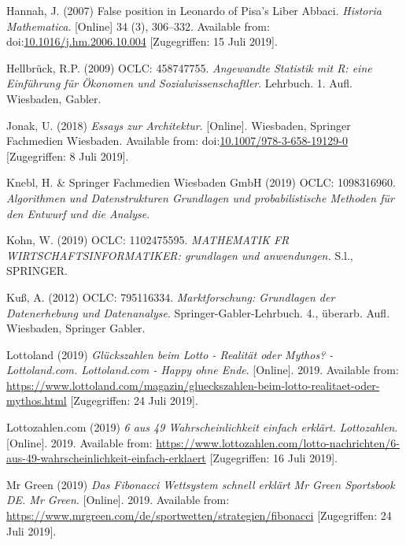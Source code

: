 \documentclass[ngerman,]{article}
\begin{document}
\hypertarget{ref-hannah_false_2007}{}
Hannah, J. (2007) False position in Leonardo of Pisa's Liber Abbaci.
\emph{Historia Mathematica}. {[}Online{]} 34 (3), 306--332. Available
from:
doi:\href{https://doi.org/10.1016/j.hm.2006.10.004}{10.1016/j.hm.2006.10.004}
{[}Zugegriffen: 15 Juli 2019{]}.

\hypertarget{ref-hellbruck_angewandte_2009}{}
Hellbrück, R.P. (2009) OCLC: 458747755. \emph{Angewandte Statistik mit
R: eine Einführung für Ökonomen und Sozialwissenschaftler}. Lehrbuch. 1.
Aufl. Wiesbaden, Gabler.

\hypertarget{ref-jonak_essays_2018}{}
Jonak, U. (2018) \emph{Essays zur Architektur}. {[}Online{]}. Wiesbaden,
Springer Fachmedien Wiesbaden. Available from:
doi:\href{https://doi.org/10.1007/978-3-658-19129-0}{10.1007/978-3-658-19129-0}
{[}Zugegriffen: 8 Juli 2019{]}.

\hypertarget{ref-knebl_algorithmen_2019}{}
Knebl, H. \& Springer Fachmedien Wiesbaden GmbH (2019) OCLC: 1098316960.
\emph{Algorithmen und Datenstrukturen Grundlagen und probabilistische
Methoden für den Entwurf und die Analyse}.

\hypertarget{ref-kohn_mathematik_2019}{}
Kohn, W. (2019) OCLC: 1102475595. \emph{MATHEMATIK FR
WIRTSCHAFTSINFORMATIKER: grundlagen und anwendungen.} S.l., SPRINGER.

\hypertarget{ref-kus_marktforschung:_2012}{}
Kuß, A. (2012) OCLC: 795116334. \emph{Marktforschung: Grundlagen der
Datenerhebung und Datenanalyse}. Springer-Gabler-Lehrbuch. 4., überarb.
Aufl. Wiesbaden, Springer Gabler.

\hypertarget{ref-lottoland_gluckszahlen_2019}{}
Lottoland (2019) \emph{Glückszahlen beim Lotto - Realität oder Mythos? -
Lottoland.com. Lottoland.com - Happy ohne Ende}. {[}Online{]}. 2019.
Available from:
\url{https://www.lottoland.com/magazin/glueckszahlen-beim-lotto-realitaet-oder-mythos.html}
{[}Zugegriffen: 24 Juli 2019{]}.

\hypertarget{ref-lottozahlen.com_6_2019}{}
Lottozahlen.com (2019) \emph{6 aus 49 Wahrscheinlichkeit einfach
erklärt. Lottozahlen}. {[}Online{]}. 2019. Available from:
\url{https://www.lottozahlen.com/lotto-nachrichten/6-aus-49-wahrscheinlichkeit-einfach-erklaert}
{[}Zugegriffen: 16 Juli 2019{]}.

\hypertarget{ref-mr_green_fibonacci_2019}{}
Mr Green (2019) \emph{Das Fibonacci Wettsystem schnell erklärt Mr Green
Sportsbook DE. Mr Green}. {[}Online{]}. 2019. Available from:
\url{https://www.mrgreen.com/de/sportwetten/strategien/fibonacci}
{[}Zugegriffen: 24 Juli 2019{]}.
\end{document}
